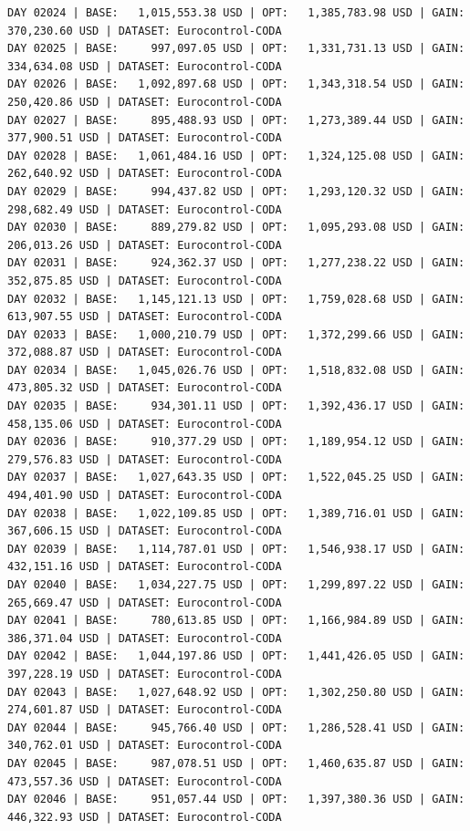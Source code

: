 \documentclass[11pt,a4paper]{article}
\begin{document}
\begin{verbatim}
DAY 02024 | BASE:   1,015,553.38 USD | OPT:   1,385,783.98 USD | GAIN: 370,230.60 USD | DATASET: Eurocontrol-CODA
DAY 02025 | BASE:     997,097.05 USD | OPT:   1,331,731.13 USD | GAIN: 334,634.08 USD | DATASET: Eurocontrol-CODA
DAY 02026 | BASE:   1,092,897.68 USD | OPT:   1,343,318.54 USD | GAIN: 250,420.86 USD | DATASET: Eurocontrol-CODA
DAY 02027 | BASE:     895,488.93 USD | OPT:   1,273,389.44 USD | GAIN: 377,900.51 USD | DATASET: Eurocontrol-CODA
DAY 02028 | BASE:   1,061,484.16 USD | OPT:   1,324,125.08 USD | GAIN: 262,640.92 USD | DATASET: Eurocontrol-CODA
DAY 02029 | BASE:     994,437.82 USD | OPT:   1,293,120.32 USD | GAIN: 298,682.49 USD | DATASET: Eurocontrol-CODA
DAY 02030 | BASE:     889,279.82 USD | OPT:   1,095,293.08 USD | GAIN: 206,013.26 USD | DATASET: Eurocontrol-CODA
DAY 02031 | BASE:     924,362.37 USD | OPT:   1,277,238.22 USD | GAIN: 352,875.85 USD | DATASET: Eurocontrol-CODA
DAY 02032 | BASE:   1,145,121.13 USD | OPT:   1,759,028.68 USD | GAIN: 613,907.55 USD | DATASET: Eurocontrol-CODA
DAY 02033 | BASE:   1,000,210.79 USD | OPT:   1,372,299.66 USD | GAIN: 372,088.87 USD | DATASET: Eurocontrol-CODA
DAY 02034 | BASE:   1,045,026.76 USD | OPT:   1,518,832.08 USD | GAIN: 473,805.32 USD | DATASET: Eurocontrol-CODA
DAY 02035 | BASE:     934,301.11 USD | OPT:   1,392,436.17 USD | GAIN: 458,135.06 USD | DATASET: Eurocontrol-CODA
DAY 02036 | BASE:     910,377.29 USD | OPT:   1,189,954.12 USD | GAIN: 279,576.83 USD | DATASET: Eurocontrol-CODA
DAY 02037 | BASE:   1,027,643.35 USD | OPT:   1,522,045.25 USD | GAIN: 494,401.90 USD | DATASET: Eurocontrol-CODA
DAY 02038 | BASE:   1,022,109.85 USD | OPT:   1,389,716.01 USD | GAIN: 367,606.15 USD | DATASET: Eurocontrol-CODA
DAY 02039 | BASE:   1,114,787.01 USD | OPT:   1,546,938.17 USD | GAIN: 432,151.16 USD | DATASET: Eurocontrol-CODA
DAY 02040 | BASE:   1,034,227.75 USD | OPT:   1,299,897.22 USD | GAIN: 265,669.47 USD | DATASET: Eurocontrol-CODA
DAY 02041 | BASE:     780,613.85 USD | OPT:   1,166,984.89 USD | GAIN: 386,371.04 USD | DATASET: Eurocontrol-CODA
DAY 02042 | BASE:   1,044,197.86 USD | OPT:   1,441,426.05 USD | GAIN: 397,228.19 USD | DATASET: Eurocontrol-CODA
DAY 02043 | BASE:   1,027,648.92 USD | OPT:   1,302,250.80 USD | GAIN: 274,601.87 USD | DATASET: Eurocontrol-CODA
DAY 02044 | BASE:     945,766.40 USD | OPT:   1,286,528.41 USD | GAIN: 340,762.01 USD | DATASET: Eurocontrol-CODA
DAY 02045 | BASE:     987,078.51 USD | OPT:   1,460,635.87 USD | GAIN: 473,557.36 USD | DATASET: Eurocontrol-CODA
DAY 02046 | BASE:     951,057.44 USD | OPT:   1,397,380.36 USD | GAIN: 446,322.93 USD | DATASET: Eurocontrol-CODA

\end{verbatim}
\end{document}

